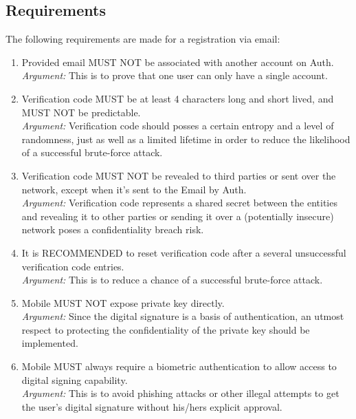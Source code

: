     \subsection{Requirements}
    The following requirements are made for a registration via email:
        \begin{enumerate}
            \item Provided email MUST NOT be associated with another account on Auth.\\
            \textit{Argument:} This is to prove that one user can only have a single account.

            \item Verification code MUST be at least 4 characters long and short lived, and MUST NOT be 
                predictable.\\        
            \textit{Argument:} Verification code should posses a certain entropy and a level of randomness, 
                            just as well as a limited lifetime in order to reduce the likelihood of a 
                            successful brute-force attack.

            \item Verification code MUST NOT be revealed to third parties or sent over the network, except when
                  it's sent to the Email by Auth.\\        
            \textit{Argument:} Verification code represents a shared secret between the entities and revealing 
                            it to other parties or sending it over a (potentially insecure) network poses 
                            a confidentiality breach risk. 

            \item It is RECOMMENDED to reset verification code after a several unsuccessful verification 
                code entries.\\        
            \textit{Argument:} This is to reduce a chance of a successful brute-force attack.

            \item Mobile MUST NOT expose private key directly.\\
            \textit{Argument:} Since the digital signature is a basis of authentication, an utmost respect to 
                            protecting the confidentiality of the private key should be implemented.

            \item Mobile MUST always require a biometric authentication to allow access to digital signing 
                capability.\\        
            \textit{Argument:} This is to avoid phishing attacks or other illegal attempts to get the user's 
                            digital signature without his/hers explicit approval.


\end{enumerate}
